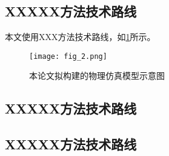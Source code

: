 \subsection{XXXXX方法技术路线}

本文使用XXX方法技术路线，如\cref{fig_2}所示。

\begin{figure}[h]
	\centering
	\texttt{[image: fig\_2.png]}
	\caption{本论文拟构建的物理仿真模型示意图}
	\label{fig_2}
\end{figure}

\subsection{XXXXX方法技术路线}

\subsection{XXXXX方法技术路线}